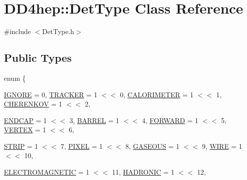 \hypertarget{class_d_d4hep_1_1_det_type}{
\section{DD4hep::DetType Class Reference}
\label{class_d_d4hep_1_1_det_type}
}


{\ttfamily \#include $<$DetType.h$>$}\subsection*{Public Types}
\begin{DoxyCompactItemize}
\item 
enum \{ \par
\hyperlink{class_d_d4hep_1_1_det_type_aca757d7a9b865d1fb8f7997eb5c0a72ca893501e77c51655ce8733333a0fd0b7b}{IGNORE} =  0, 
\hyperlink{class_d_d4hep_1_1_det_type_aca757d7a9b865d1fb8f7997eb5c0a72cae974ecec59fd2a2900db7e5f44cd0884}{TRACKER} =  1 $<$$<$ 0, 
\hyperlink{class_d_d4hep_1_1_det_type_aca757d7a9b865d1fb8f7997eb5c0a72ca49b1bf5367ff45451add8edbeb91fdfc}{CALORIMETER} =  1 $<$$<$ 1, 
\hyperlink{class_d_d4hep_1_1_det_type_aca757d7a9b865d1fb8f7997eb5c0a72ca860f2491216e5b5b990a25f9ec20c810}{CHERENKOV} =  1 $<$$<$ 2, 
\par
\hyperlink{class_d_d4hep_1_1_det_type_aca757d7a9b865d1fb8f7997eb5c0a72ca0f447c234bc6e949ee7cfab0fef5a408}{ENDCAP} =  1 $<$$<$ 3, 
\hyperlink{class_d_d4hep_1_1_det_type_aca757d7a9b865d1fb8f7997eb5c0a72caaca38656f429ac259f2aeb2a22359c1e}{BARREL} =  1 $<$$<$ 4, 
\hyperlink{class_d_d4hep_1_1_det_type_aca757d7a9b865d1fb8f7997eb5c0a72cad6006f8399753305eec23b7be341de8b}{FORWARD} =  1 $<$$<$ 5, 
\hyperlink{class_d_d4hep_1_1_det_type_aca757d7a9b865d1fb8f7997eb5c0a72cadd4fea08e228d05a34ba2e613697d85e}{VERTEX} =  1 $<$$<$ 6, 
\par
\hyperlink{class_d_d4hep_1_1_det_type_aca757d7a9b865d1fb8f7997eb5c0a72ca47882873d22cd7ded73b8599713e5c98}{STRIP} =  1 $<$$<$ 7, 
\hyperlink{class_d_d4hep_1_1_det_type_aca757d7a9b865d1fb8f7997eb5c0a72ca1f451f05a5274d067d92755139995dd3}{PIXEL} =  1 $<$$<$ 8, 
\hyperlink{class_d_d4hep_1_1_det_type_aca757d7a9b865d1fb8f7997eb5c0a72ca80e57e0db6dcb4c29a22b45f3f4cbbb1}{GASEOUS} =  1 $<$$<$ 9, 
\hyperlink{class_d_d4hep_1_1_det_type_aca757d7a9b865d1fb8f7997eb5c0a72ca48f5950dd5739306bfb69120dca0c01c}{WIRE} =  1 $<$$<$ 10, 
\par
\hyperlink{class_d_d4hep_1_1_det_type_aca757d7a9b865d1fb8f7997eb5c0a72ca8ac1cb2272cf4988890a08708739e617}{ELECTROMAGNETIC} =  1 $<$$<$ 11, 
\hyperlink{class_d_d4hep_1_1_det_type_aca757d7a9b865d1fb8f7997eb5c0a72cad28e5cc08852f472bc21760aba0d5e99}{HADRONIC} =  1 $<$$<$ 12, 
$$
\end{DoxyCompactItemize}
